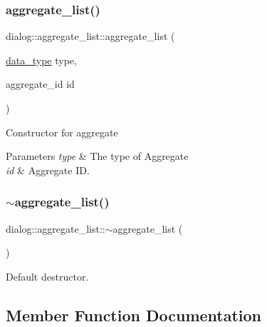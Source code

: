 \subsubsection{\texorpdfstring{aggregate\+\_\+list()}{aggregate\_list()}\hspace{0.1cm}{\footnotesize\ttfamily [3/3]}}
{\footnotesize\ttfamily dialog\+::aggregate\+\_\+list\+::aggregate\+\_\+list (\begin{DoxyParamCaption}\item[{\hyperlink{structdialog_1_1data__type}{data\+\_\+type}}]{type,  }\item[{aggregate\+\_\+id}]{id }\end{DoxyParamCaption})\hspace{0.3cm}{\ttfamily [inline]}}

Constructor for aggregate


\begin{DoxyParams}{Parameters}
{\em type} & The type of Aggregate \\
\hline
{\em id} & Aggregate ID. \\
\hline
\end{DoxyParams}
\mbox{\label{classdialog_1_1aggregate__list_ad767031cda7f81971814ff328371f22d}} 
\subsubsection{\texorpdfstring{$\sim$aggregate\+\_\+list()}{~aggregate\_list()}}
{\footnotesize\ttfamily dialog\+::aggregate\+\_\+list\+::$\sim$aggregate\+\_\+list (\begin{DoxyParamCaption}{ }\end{DoxyParamCaption})\hspace{0.3cm}{\ttfamily [default]}}

Default destructor. 

\subsection{Member Function Documentation}
\mbox{\label{classdialog_1_1aggregate__list_aaa2ee2ba5a82eb6f6a31b33b0dcb93da}} 
